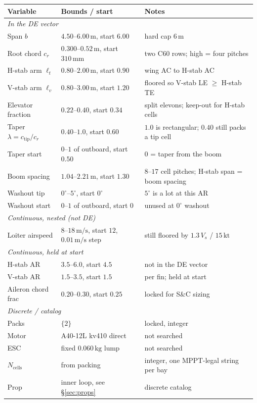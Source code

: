 \documentclass[11pt,letterpaper]{article}
\begin{document}
\begin{center}
\begin{tabular}{@{}lll@{}}
\toprule
Variable & Bounds / start & Notes \\
\midrule
\multicolumn{3}{l}{\emph{In the DE vector}} \\
Span $b$ & $4.50$--$6.00\,\mathrm{m}$, start $6.00$ & hard cap $6\,\mathrm{m}$ \\
Root chord $c_r$ & $0.300$--$0.52\,\mathrm{m}$, start $310\,\mathrm{mm}$ & two C60 rows; high = four pitches \\
H-stab arm $\ell_t$ & $0.80$--$2.00\,\mathrm{m}$, start $0.90$ & wing AC to H-stab AC \\
V-stab arm $\ell_v$ & $0.80$--$3.00\,\mathrm{m}$, start $1.20$ & floored so V-stab LE $\ge$ H-stab TE \\
Elevator fraction & $0.22$--$0.40$, start $0.34$ & split elevons; keep-out for H-stab cells \\
Taper $\lambda = c_\mathrm{tip}/c_r$ & $0.40$--$1.0$, start $0.60$ & $1.0$ is rectangular; $0.40$ still packs a tip cell \\
Taper start & $0$--$1$ of outboard, start $0.50$ & $0$ = taper from the boom \\
Boom spacing & $1.04$--$2.21\,\mathrm{m}$, start $1.30$ & $8$--$17$ cell pitches; H-stab span = boom spacing \\
Washout tip & $0^\circ$--$5^\circ$, start $0^\circ$ & $5^\circ$ is a lot at this AR \\
Washout start & $0$--$1$ of outboard, start $0$ & unused at $0^\circ$ washout \\
\midrule
\multicolumn{3}{l}{\emph{Continuous, nested (not DE)}} \\
Loiter airspeed & $8$--$18\,\mathrm{m/s}$, start $12$, $0.01\,\mathrm{m/s}$ step & still floored by $1.3\,V_s$ / $15\,\mathrm{kt}$ \\
\midrule
\multicolumn{3}{l}{\emph{Continuous, held at start}} \\
H-stab AR & $3.5$--$6.0$, start $4.5$ & not in the DE vector \\
V-stab AR & $1.5$--$3.5$, start $1.5$ & per fin; held at start \\
Aileron chord frac & $0.20$--$0.30$, start $0.25$ & locked for S\&C sizing \\
\midrule
\multicolumn{3}{l}{\emph{Discrete / catalog}} \\
Packs & $\{2\}$ & locked, integer \\
Motor & A40-12L kv410 direct & not searched \\
ESC & fixed $0.060\,\mathrm{kg}$ lump & not searched \\
$N_\mathrm{cells}$ & from packing & integer, one MPPT-legal string per bay \\
Prop & inner loop, see \S\ref{sec:props} & discrete catalog \\
\bottomrule
\end{tabular}
\end{center}
\end{document}
